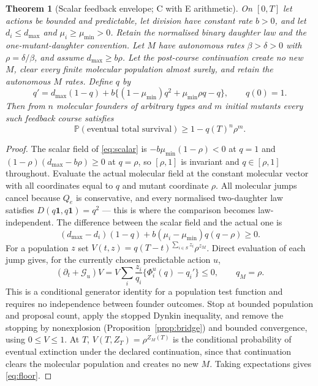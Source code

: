 \documentclass[11pt]{article}
\newtheorem{theorem}{Theorem}[section]
\theoremstyle{remark}
\newcommand{\Prb}{\mathbb P}
\newcommand{\one}{\mathbf 1}
\begin{document}
\begin{theorem}[Scalar feedback envelope; C with E arithmetic]\label{thm:floor}
On $[0,T]$ let actions be bounded and predictable, let division have constant
rate $b>0$, and let $d_i\le d_{\max}$ and $\mu_i\ge\mu_{\min}>0$. Retain the
normalised binary daughter law and the one-mutant-daughter convention. Let $M$
have autonomous rates $\beta>\delta>0$ with $\rho=\delta/\beta$, and assume
$d_{\max}\ge b\rho$. Let the post-course continuation create no new $M$, clear
every finite molecular population almost surely, and retain the autonomous $M$
rates. Define $q$ by
\begin{equation}
 q'=d_{\max}(1-q)+b\bigl\{(1-\mu_{\min})q^2+\mu_{\min}\rho q-q\bigr\},
 \qquad q(0)=1.\label{eq:scalar}
\end{equation}
Then from $n$ molecular founders of arbitrary types and $m$ initial mutants every
such feedback course satisfies
\begin{equation}
 \Prb(\text{eventual total survival})\ge1-q(T)^n\rho^m.\label{eq:floor}
\end{equation}
\end{theorem}

\begin{proof}
The scalar field of \eqref{eq:scalar} is $-b\mu_{\min}(1-\rho)<0$ at $q=1$ and
$(1-\rho)(d_{\max}-b\rho)\ge0$ at $q=\rho$, so $[\rho,1]$ is invariant and
$q\in[\rho,1]$ throughout. Evaluate the actual molecular field at the constant
molecular vector with all coordinates equal to $q$ and mutant coordinate $\rho$.
All molecular jumps cancel because $Q_e$ is conservative, and every normalised
two-daughter law satisfies $D(q\one,q\one)=q^2$ --- this is where the comparison
becomes law-independent. The difference between the scalar field and the actual
one is
\[
 (d_{\max}-d_i)(1-q)+b(\mu_i-\mu_{\min})q(q-\rho)\ge0.
\]
For a population $z$ set $V(t,z)=q(T-t)^{\sum_{i\in S}z_i}\rho^{z_M}$. Direct
evaluation of each jump gives, for the currently chosen predictable action $u$,
\[
 (\partial_t+\mathcal G_u)V=V\sum_i\frac{z_i}{q_i}\{\Phi_i^u(q)-q_i'\}\le0,
 \qquad q_M=\rho.
\]
This is a conditional generator identity for a population test function and
requires no independence between founder outcomes. Stop at bounded population and
proposal count, apply the stopped Dynkin inequality, and remove the stopping by
nonexplosion (Proposition~\ref{prop:bridge}) and bounded convergence, using
$0\le V\le1$. At $T$, $V(T,Z_T)=\rho^{Z_M(T)}$ is the conditional probability of
eventual extinction under the declared continuation, since that continuation
clears the molecular population and creates no new $M$. Taking expectations gives
\eqref{eq:floor}.
\end{proof}
\end{document}
